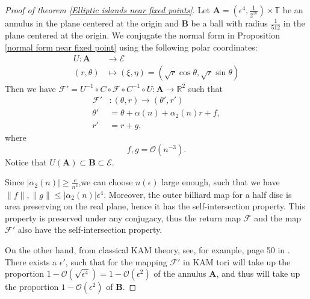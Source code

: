 \documentclass{article}
\numberwithin{figure}{section}
\numberwithin{equation}{section}
\theoremstyle{remark}
\newtheorem*{remark}{Remark}
\theoremstyle{definition}
\begin{document}

\begin{proof}[Proof of theorem \ref{Elliptic islands near fixed points}]
	    
	     Let $\textbf{A}=\left(\epsilon^4,\frac{1}{2^{18}}\right) \times \mathbb{T}$ be an annulus in the plane centered at the origin and $\textbf{B}$ be a ball with radius $\frac{1}{512}$ in the plane centered at the origin.
        We conjugate the normal form in Proposition \ref{normal form near fixed point} using the following polar coordinates:
     	\begin{align*}
     			U: \textbf{A} & \rightarrow \mathcal{E}\\
     			(r,\theta)& \mapsto (\xi,\eta)=\left( \sqrt{r}\cos\theta,\sqrt{r}\sin\theta \right)
     	\end{align*}
     Then we have 	$\mathcal{F}' =U^{-1}\circ C\circ  \mathcal{F} \circ C^{-1} \circ U:\textbf{A} \rightarrow \mathbb{R}^2$ such that
     	\begin{align*}
     		\mathcal{F}' &: (\theta,r) \rightarrow (\theta',r')\\
     		\theta'&=\theta+\alpha(n)+\alpha_2(n)r+f,\\
     		r' &= r +g,
     	\end{align*}	
     where 
     $$f,g=\mathcal{O}(n^{-3}).$$
     	Notice that  $U(\textbf{A})\subset \textbf{B}\subset\mathcal{E}$.
     	
        Since $\left|\alpha_{2}(n)\right| \geq \frac{c}{n^{2}}$,we can choose $n(\epsilon)$ large enough, such that we have $\|f\|,\|g\| \leq |\alpha_2(n)|\epsilon^4$. 
        Moreover, the outer billiard map for a half disc is area preserving on the real plane, hence it has the self-intersection property. This property is preserved under any conjugacy, thus the return map $\mathcal{F}$ and the map $\mathcal{F}'$ also have the self-intersection property. 
        
       
        
        On the other hand, from classical KAM theory, see, for example, page 50 in \cite{Moser+2001}. There exists a $\epsilon'$, such that for the mapping $\mathcal{F}'$ in KAM tori will take up the proportion $1-\mathcal{O}\left(\sqrt{\epsilon^4}\right)=1-\mathcal{O}\left(\epsilon^2\right)$ of the annulus $\textbf{A}$, and thus will take up the proportion $1-\mathcal{O}\left(\epsilon^2\right)$ of $\mathbf{B}$.
       

\end{proof}
\end{document}
